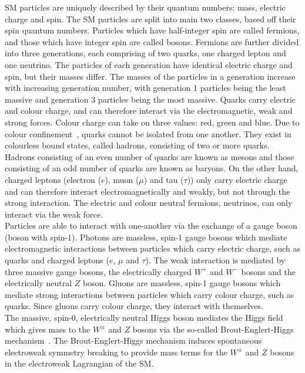 SM particles are uniquely described by their quantum numbers: mass, electric charge and spin. The SM particles are split into main two classes, based off their spin quantum numbers. Particles which have half-integer spin are called fermions, and those which have integer spin are called bosons. Fermions are further divided into three generations, each comprising of two quarks, one charged lepton and one neutrino. The particles of each generation have identical electric charge and spin, but their masses differ. The masses of the particles in a generation increase with increasing generation number, with generation 1 particles being the least massive and generation 3 particles being the most massive. Quarks carry electric and colour charge, and can therefore interact via the electromagnetic, weak and strong forces. Colour charge can take on three values: red, green and blue. Due to colour confinement~\cite{quark-confinement}, quarks cannot be isolated from one another. They exist in colourless bound states, called hadrons, consisting of two or more quarks. Hadrons consisting of an even number of quarks are known as mesons and those consisting of an odd number of quarks are known as baryons. On the other hand, charged leptons (electron ($e$), muon ($\mu$) and tau ($\tau$)) only carry electric charge and can therefore interact electromagnetically and weakly, but not through the strong interaction. The electric and colour neutral fermions, neutrinos, can only interact via the weak force.\\

\noindent
Particles are able to interact with one-another via the exchange of a gauge boson (boson with spin-1). Photons are massless, spin-1 gauge bosons which mediate electromagnetic interactions between particles which carry electric charge, such as quarks and charged leptons ($e$, $\mu$ and $\tau$). The weak interaction is mediated by three massive gauge bosons, the electrically charged $W^{+}$ and $W^{-}$ bosons and the electrically neutral $Z$ boson. Gluons are massless, spin-1 gauge bosons which mediate strong interactions between particles which carry colour charge, such as quarks. Since gluons carry colour charge, they interact with themselves.\\

\noindent
The massive, spin-0, electrically neutral Higgs boson mediates the Higgs field which gives mass to the $W^{\pm}$ and $Z$ bosons via the so-called Brout-Englert-Higgs mechanism~\cite{PhysRevLett.13.321, Higgs:1966ev, Higgs:1964pj}. The Brout-Englert-Higgs mechanism induces spontaneous electroweak symmetry breaking to provide mass terms for the $W^{\pm}$ and $Z$ bosons in the electroweak Lagrangian of the SM.\\ 

